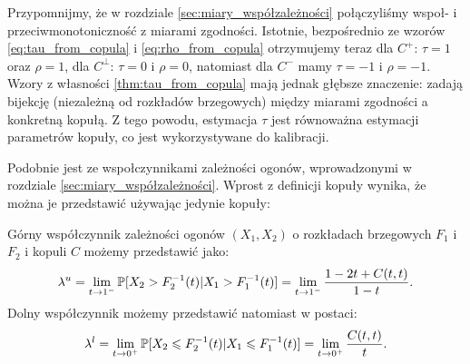 Przypomnijmy, że w rozdziale \ref{sec:miary_współzależności} połączyliśmy wspoł- i przeciwmonotoniczność z miarami zgodności. Istotnie, bezpośrednio ze wzorów \ref{eq:tau_from_copula} i \ref{eq:rho_from_copula} otrzymujemy teraz dla $C^{+}$: $\tau=1$ oraz $\rho=1$, dla $C^{\perp}$: $\tau=0$ i $\rho=0$, natomiast dla $C^{-}$ mamy $\tau=-1$ i $\rho=-1$. Wzory z własności \ref{thm:tau_from_copula} mają jednak głębsze znaczenie: zadają bijekcję (niezależną od rozkładów brzegowych) między miarami zgodności a konkretną kopułą. Z tego powodu, estymacja $\tau$ jest równoważna estymacji parametrów kopuły, co jest wykorzystywane do kalibracji.

Podobnie jest ze wspołczynnikami zależności ogonów, wprowadzonymi w rozdziale \ref{sec:miary_współzależności}. Wprost z definicji kopuły wynika, że można je przedstawić używając jedynie kopuły:
\begin{prop}
		Górny współczynnik zależności ogonów $(X_1, X_2)$ o rozkładach brzegowych $F_1$ i $F_2$ i kopuli $C$ możemy przedstawić jako:
		$$ \lambda^{u} = \lim\limits_{t\to1^{-}}\mathbb{P}[X_2 > F_2^{-1}(t) \vert X_1 > F_1^{-1}(t) ] = \lim\limits_{t\to1^{-}}\frac{1-2t+C(t, t)}{1-t}.$$
		Dolny współczynnik możemy przedstawić natomiast w postaci:
		$$ \lambda^{l} = \lim\limits_{t\to0^{+}}\mathbb{P}[X_2 \leqslant F_2^{-1}(t) \vert X_1 \leqslant F_1^{-1}(t) ] = \lim\limits_{t\to0^{+}}\frac{C(t, t)}{t}.$$
\end{prop}